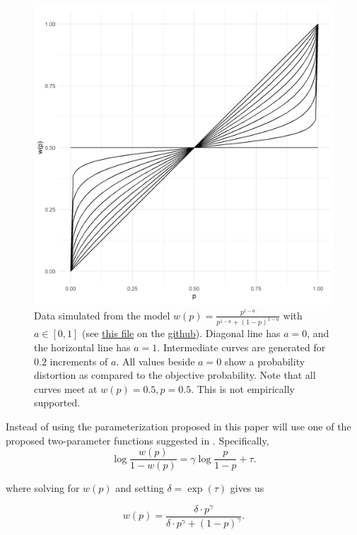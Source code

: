 \documentclass[12pt]{article}
\begin{document}
\begin{figure}[H]
	\includegraphics[width = \linewidth]{../Figures/oneParam.png}
	\caption{Data simulated from the model
		$w(p) = \frac{p^{1-a}}
		{p^{1-a}+(1-p)^{1-a}}$ with
		$a \in [0, 1]$ (see
		\href{https://github.com/victor-m-p/BayesianDecisionWeights/blob/main/Code/0_visualize_parameters.Rmd}
		{this file} on the
		\href{https://github.com/victor-m-p/BayesianDecisionWeights}{github}).
		Diagonal line has
		$a = 0$, and the horizontal line
		has $a = 1$. Intermediate curves
		are generated for $0.2$ increments
		of $a$. All values beside
		$a = 0$ show a probability distortion
		as compared to the objective probability.
		Note that all curves meet at
		$w(p) = 0.5, p = 0.5$. This is
	not empirically supported.}
\end{figure}

Instead of using the parameterization
proposed in \textcite{rottenstreich2001money}
this paper will use one of the
proposed two-parameter functions
suggested in \textcite{gonzalez1999shape}.
Specifically,
\[
	\log\frac{w(p)}{1-w(p)} =
	\gamma \log\frac{p}{1-p} + \tau
.\]

where solving for $w(p)$ and setting $\delta = \exp(\tau)$
gives us

\[
	w(p) = \frac{\delta \cdot p^{\gamma}}
	{\delta \cdot p^{\gamma} +
	(1-p)^{\gamma}}
.\]
\end{document}

